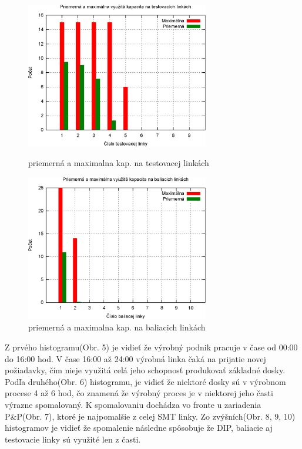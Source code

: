 \documentclass[12pt,a4paper,titlepage,final]{article}
\begin{document}
\begin{figure}[ht]
  \centering
  \begin{minipage}{0.45\linewidth}
  \centering
  \includegraphics[width=8cm]{doc/1_hist5.eps}
  \caption{priemerná a maximalna kap. na testovacej linkách}
  \end{minipage}
  \quad
  \begin{minipage}{0.45\linewidth}
    \centering
    \includegraphics[width=8cm]{doc/1_hist6.eps}
    \caption{priemerná a maximalna kap. na baliacich linkách}
  \end{minipage}
\end{figure}

Z prvého histogramu(Obr. 5) je vidieť že výrobný podnik pracuje v čase od 00:00 do 16:00 hod.
V čase 16:00 až 24:00 výrobná linka čaká na prijatie novej požiadavky, čím nieje 
využitá celá jeho schopnosť produkovať základné dosky. Podľa druhého(Obr. 6) histogramu,
je vidieť že niektoré dosky sú v výrobnom procese 4 až 6 hod, čo znamená že výrobný
proces je v niektorej jeho časti výrazne spomalovaný. K spomalovaniu dochádza 
vo fronte u zariadenia P\&P(Obr. 7), ktoré je najpomalšie z celej SMT linky.
Zo zvýšních(Obr. 8, 9, 10) histogramov je vidieť že spomalenie následne spôsobuje že DIP, baliacie aj
testovacie linky sú využité len z časti.
\end{document}
